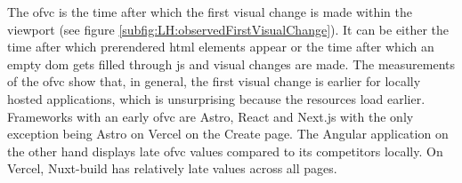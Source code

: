 \documentclass[a4paper, 12pt]{article}
\begin{document}
The \acrshort{ofvc} is the time after which the first visual change is made within the viewport (see figure \ref{subfig:LH:observedFirstVisualChange}).
It can be either the time after which prerendered \acrshort{html} elements appear or the time after which an empty \acrshort{dom} gets filled through \acrshort{js} and visual changes are made.
The measurements of the \acrshort{ofvc} show that, in general, the first visual change is earlier for locally hosted applications, which is unsurprising because the resources load earlier.
Frameworks with an early \acrshort{ofvc} are Astro, React and Next.js with the only exception being Astro on Vercel on the Create page.
The Angular application on the other hand displays late \acrshort{ofvc} values compared to its competitors locally.
On Vercel, Nuxt-build has relatively late values across all pages.

\end{document}
